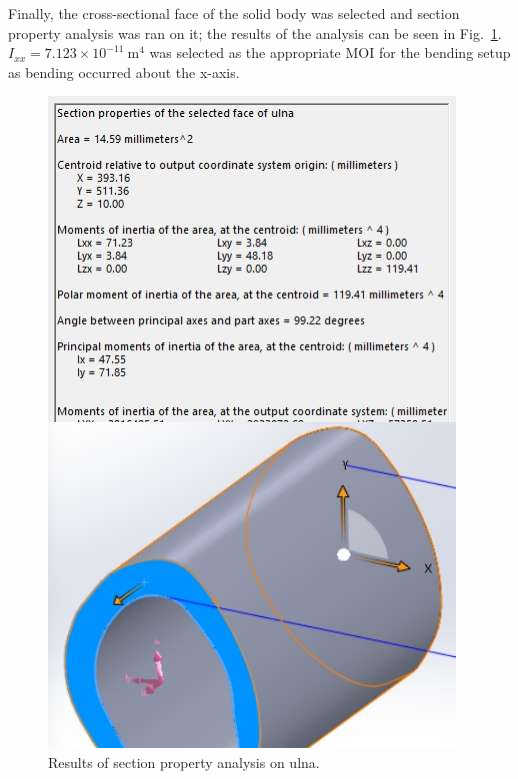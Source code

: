 \documentclass[conference, letterpaper]{IEEEtran}
\begin{document}
            Finally, the cross-sectional face of the solid body was selected and section property analysis was ran on it; the results of the analysis can be seen in Fig.~\ref{ulna_section}. \(I_{xx} = 7.123\times10^{-11}\ \text{m}^4\)  was selected as the appropriate MOI for the bending setup as bending occurred about the x-axis.
            \begin{figure}[htbp]
                \centerline{\includegraphics[width = \linewidth]{ulna_section.jpg}}
                \caption{Results of section property analysis on ulna.}\label{ulna_section}
            \end{figure}
            
\end{document}
